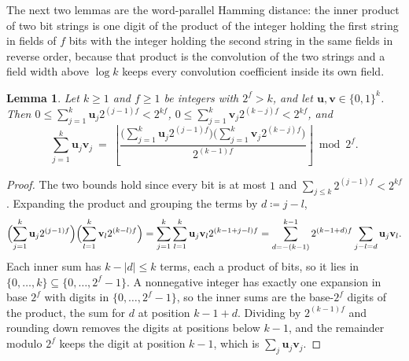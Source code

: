 \documentclass[11pt]{article}
\newtheorem{lemma}[theorem]{Lemma}
\theoremstyle{remark}
\newcommand{\uu}{\mathbf u}
\newcommand{\defeq}{\coloneqq}
\newcommand{\vv}{\mathbf v}
\begin{document}
The next two lemmas are the word-parallel Hamming distance: the inner
product of two bit strings is one digit of the product of the integer
holding the first string in fields of $f$ bits with the integer holding
the second string in the same fields in reverse order, because that
product is the convolution of the two strings and a field width above
$\log k$ keeps every convolution coefficient inside its own field.

\begin{lemma}\label{lem:packed-product}
Let $k\ge1$ and $f\ge1$ be integers with $2^{f}>k$, and let
$\uu,\vv\in\{0,1\}^{k}$.
Then
$0\le\sum_{j=1}^{k}\uu_j2^{(j-1)f}<2^{kf}$,
$0\le\sum_{j=1}^{k}\vv_j2^{(k-j)f}<2^{kf}$, and
\[
\sum_{j=1}^{k}\uu_j\vv_j
\ =\ \left\lfloor\frac{\bigl(\sum_{j=1}^{k}\uu_j2^{(j-1)f}\bigr)
\bigl(\sum_{j=1}^{k}\vv_j2^{(k-j)f}\bigr)}{2^{(k-1)f}}\right\rfloor\bmod2^{f}.
\]
\end{lemma}
\begin{proof}
The two bounds hold since every bit is at most $1$ and
$\sum_{j\le k}2^{(j-1)f}<2^{kf}$.
Expanding the product and grouping the terms by $d\defeq j-l$,
\[
\Bigl(\sum_{j=1}^{k}\uu_j2^{(j-1)f}\Bigr)
\Bigl(\sum_{l=1}^{k}\vv_l2^{(k-l)f}\Bigr)
=\sum_{j=1}^{k}\sum_{l=1}^{k}\uu_j\vv_l2^{(k-1+j-l)f}
=\sum_{d=-(k-1)}^{k-1}2^{(k-1+d)f}\sum_{j-l=d}\uu_j\vv_l .
\]
Each inner sum has $k-|d|\le k$ terms, each a product of bits, so it lies
in $\{0,\dots,k\}\subseteq\{0,\dots,2^{f}-1\}$.
A nonnegative integer has exactly one expansion in base $2^{f}$ with
digits in $\{0,\dots,2^{f}-1\}$, so the inner sums are the base-$2^{f}$
digits of the product, the sum for $d$ at position $k-1+d$.
Dividing by $2^{(k-1)f}$ and rounding down removes the digits at
positions below $k-1$, and the remainder modulo $2^{f}$ keeps the digit at
position $k-1$, which is $\sum_j\uu_j\vv_j$.
\end{proof}
\end{document}
